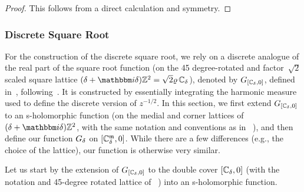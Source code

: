 \documentclass[12pt,oneside,english]{amsart}
\numberwithin{equation}{section}
\numberwithin{figure}{section}
\theoremstyle{plain}
\theoremstyle{plain}
\theoremstyle{plain}
\theoremstyle{plain}
\theoremstyle{remark}
\theoremstyle{definition}
\theoremstyle{plain}
\theoremstyle{plain}
\numberwithin{thm}{section}
\begin{document}
\begin{proof}
This follows from a direct calculation and symmetry. 
\end{proof}

\subsubsection{Discrete Square Root}
For the construction of the discrete square root, we rely on a discrete 
analogue of the real part of the square root function (on the 45 degree-rotated 
and factor~$\sqrt{2}$ scaled square lattice
$(\delta + \ii \delta) \Z^2 = \sqrt{2} \varrho \, \dC$), denoted by 
$G_{{\left[ {\mathbb{C}_{{\delta}}}, 0 \right]}}$, defined 
in~\cite{gheissari-hongler-park}, following~\cite{chelkak-hongler-izyurov}.
It is constructed by essentially integrating the harmonic measure
used to define the discrete version of $z^{-1/2}$. In this section,
we first extend $G_{{\left[ {\mathbb{C}_{{\delta}}}, 0 \right]}}$ to an s-holomorphic
function (on the medial and corner lattices of $(\delta + \ii \delta) \Z^2$, 
with the same notation
and conventions as in~%
\cite{gheissari-hongler-park}), and then define
our function $G_{{\delta}}$ on ${\left[ {\mathbb{C}_{{\delta}}^{\mathfrak{m}}}, 0 \right]}$.
While there are a few differences (e.g., the choice of the lattice),
our function is otherwise very similar.


Let us start by the extension of $G_{{\left[ {\mathbb{C}_{{\delta}}}, 0 \right]}}$
to the double cover ${\left[ {\mathbb{C}_{{\delta}}}, 0 \right]}$ (with the
notation and 45-degree rotated lattice of~%
\cite{gheissari-hongler-park})
into an s-holomorphic function.
\end{document}
